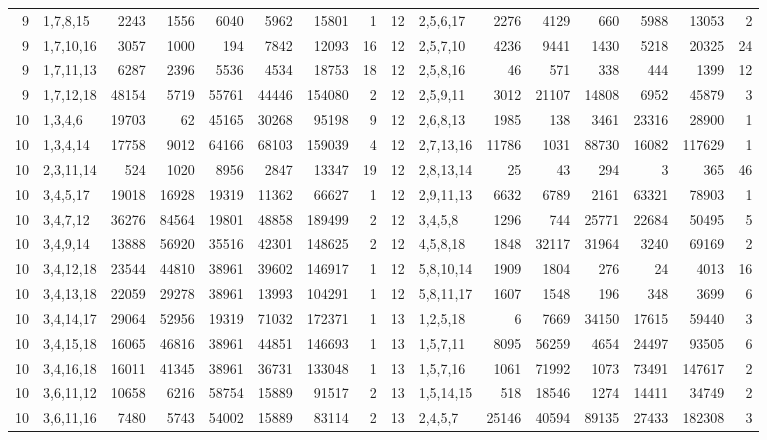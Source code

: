 \begin{table}[tp]
\begin{ruledtabular}
\begin{tabular}{rlrrrrrr@{\hspace{2.2em}}rlrrrrrr}
9 & 1,7,8,15 & 2243 & 1556 & 6040 & 5962 & 15801 & 1 & 12 & 2,5,6,17 & 2276 & 4129 & 660 & 5988 & 13053 & 2 \\
9 & 1,7,10,16 & 3057 & 1000 & 194 & 7842 & 12093 & 16 & 12 & 2,5,7,10 & 4236 & 9441 & 1430 & 5218 & 20325 & 24 \\
9 & 1,7,11,13 & 6287 & 2396 & 5536 & 4534 & 18753 & 18 & 12 & 2,5,8,16 & 46 & 571 & 338 & 444 & 1399 & 12 \\
9 & 1,7,12,18 & 48154 & 5719 & 55761 & 44446 & 154080 & 2 & 12 & 2,5,9,11 & 3012 & 21107 & 14808 & 6952 & 45879 & 3 \\
10 & 1,3,4,6 & 19703 & 62 & 45165 & 30268 & 95198 & 9 & 12 & 2,6,8,13 & 1985 & 138 & 3461 & 23316 & 28900 & 1 \\
10 & 1,3,4,14 & 17758 & 9012 & 64166 & 68103 & 159039 & 4 & 12 & 2,7,13,16 & 11786 & 1031 & 88730 & 16082 & 117629 & 1 \\
10 & 2,3,11,14 & 524 & 1020 & 8956 & 2847 & 13347 & 19 & 12 & 2,8,13,14 & 25 & 43 & 294 & 3 & 365 & 46 \\
10 & 3,4,5,17 & 19018 & 16928 & 19319 & 11362 & 66627 & 1 & 12 & 2,9,11,13 & 6632 & 6789 & 2161 & 63321 & 78903 & 1 \\
10 & 3,4,7,12 & 36276 & 84564 & 19801 & 48858 & 189499 & 2 & 12 & 3,4,5,8 & 1296 & 744 & 25771 & 22684 & 50495 & 5 \\
10 & 3,4,9,14 & 13888 & 56920 & 35516 & 42301 & 148625 & 2 & 12 & 4,5,8,18 & 1848 & 32117 & 31964 & 3240 & 69169 & 2 \\
10 & 3,4,12,18 & 23544 & 44810 & 38961 & 39602 & 146917 & 1 & 12 & 5,8,10,14 & 1909 & 1804 & 276 & 24 & 4013 & 16 \\
10 & 3,4,13,18 & 22059 & 29278 & 38961 & 13993 & 104291 & 1 & 12 & 5,8,11,17 & 1607 & 1548 & 196 & 348 & 3699 & 6 \\
10 & 3,4,14,17 & 29064 & 52956 & 19319 & 71032 & 172371 & 1 & 13 & 1,2,5,18 & 6 & 7669 & 34150 & 17615 & 59440 & 3 \\
10 & 3,4,15,18 & 16065 & 46816 & 38961 & 44851 & 146693 & 1 & 13 & 1,5,7,11 & 8095 & 56259 & 4654 & 24497 & 93505 & 6 \\
10 & 3,4,16,18 & 16011 & 41345 & 38961 & 36731 & 133048 & 1 & 13 & 1,5,7,16 & 1061 & 71992 & 1073 & 73491 & 147617 & 2 \\
10 & 3,6,11,12 & 10658 & 6216 & 58754 & 15889 & 91517 & 2 & 13 & 1,5,14,15 & 518 & 18546 & 1274 & 14411 & 34749 & 2 \\
10 & 3,6,11,16 & 7480 & 5743 & 54002 & 15889 & 83114 & 2 & 13 & 2,4,5,7 & 25146 & 40594 & 89135 & 27433 & 182308 & 3 \\

\end{tabular}
\end{ruledtabular}
\end{table}

